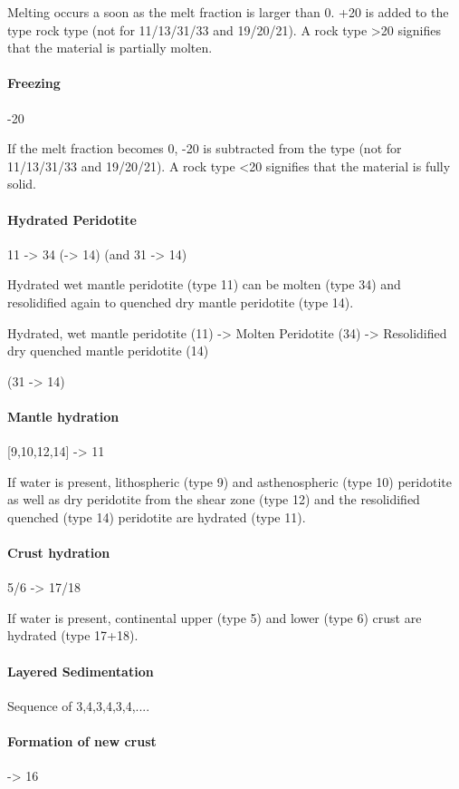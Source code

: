 Melting occurs a soon as the melt fraction is larger than 0.
+20 is added to the type rock type (not for 11/13/31/33 and 19/20/21). A rock type >20 signifies that the material is partially molten.

\paragraph{Freezing}
-20

If the melt fraction becomes 0, -20 is subtracted from the type (not for 11/13/31/33 and 19/20/21). A rock type <20 signifies that the material is fully solid.

\paragraph{Hydrated Peridotite}
11 -> 34 (-> 14) (and 31 -> 14)

Hydrated wet mantle peridotite (type 11) can be molten (type 34) and resolidified again to quenched dry mantle peridotite (type 14).

Hydrated, wet mantle peridotite (11) -> Molten Peridotite (34) -> Resolidified dry quenched mantle peridotite (14)

(31 -> 14)

\paragraph{Mantle hydration}
[9,10,12,14] -> 11

If water is present, lithospheric (type 9) and asthenospheric (type 10) peridotite as well as dry peridotite from the shear zone (type 12) and the resolidified quenched (type 14) peridotite are hydrated (type 11).

\paragraph{Crust hydration}
5/6 -> 17/18

If water is present, continental upper (type 5) and lower (type 6) crust are hydrated (type 17+18).

\paragraph{Layered Sedimentation}
Sequence of 3,4,3,4,3,4,....

\paragraph{Formation of new crust}
-> 16

